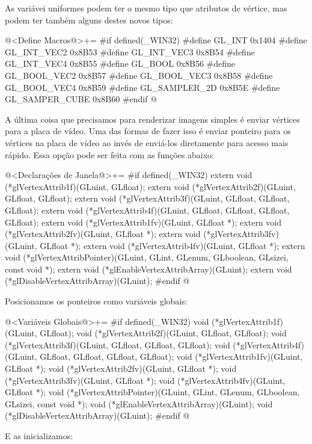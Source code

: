 As variávei uniformes podem ter o mesmo tipo que atributos de vértice,
mas podem ter também alguns destes novos tipos:

\iniciocodigo
@<Define Macros@>+=
#if defined(_WIN32)
#define GL_INT         0x1404
#define GL_INT_VEC2    0x8B53
#define GL_INT_VEC3    0x8B54
#define GL_INT_VEC4    0x8B55
#define GL_BOOL        0x8B56
#define GL_BOOL_VEC2   0x8B57
#define GL_BOOL_VEC3   0x8B58
#define GL_BOOL_VEC4   0x8B59
#define GL_SAMPLER_2D  0x8B5E
#define GL_SAMPER_CUBE 0x8B60
#endif
@
\fimcodigo

A última coisa que precisamos para renderizar imagens simples é enviar
vértices para a placa de vídeo. Uma das formas de fazer isso é enviar
ponteiro para os vértices na placa de vídeo ao invés de enviá-los
diretamente para acesso mais rápido. Essa opção pode ser feita com as
funções abaixo:

\iniciocodigo
@<Declarações de Janela@>+=
#if defined(_WIN32)
extern void (*glVertexAttrib1f)(GLuint, GLfloat);
extern void (*glVertexAttrib2f)(GLuint, GLfloat, GLfloat);
extern void (*glVertexAttrib3f)(GLuint, GLfloat, GLfloat, GLfloat);
extern void (*glVertexAttrib4f)(GLuint, GLfloat, GLfloat, GLfloat, GLfloat);
extern void (*glVertexAttrib1fv)(GLuint, GLfloat *);
extern void (*glVertexAttrib2fv)(GLuint, GLfloat *);
extern void (*glVertexAttrib3fv)(GLuint, GLfloat *);
extern void (*glVertexAttrib4fv)(GLuint, GLfloat *);
extern void (*glVertexAttribPointer)(GLuint, GLint, GLenum, GLboolean,
                                     GLsizei, const void *);
extern void (*glEnableVertexAttribArray)(GLuint);
extern void (*glDisableVertexAttribArray)(GLuint);
#endif
@
\fimcodigo

Posicionamos os ponteiros como variáveis globais:

\iniciocodigo
@<Variáveis Globais@>+=
#if defined(_WIN32)
void (*glVertexAttrib1f)(GLuint, GLfloat);
void (*glVertexAttrib2f)(GLuint, GLfloat, GLfloat);
void (*glVertexAttrib3f)(GLuint, GLfloat, GLfloat, GLfloat);
void (*glVertexAttrib4f)(GLuint, GLfloat, GLfloat, GLfloat, GLfloat);
void (*glVertexAttrib1fv)(GLuint, GLfloat *);
void (*glVertexAttrib2fv)(GLuint, GLfloat *);
void (*glVertexAttrib3fv)(GLuint, GLfloat *);
void (*glVertexAttrib4fv)(GLuint, GLfloat *);
void (*glVertexAttribPointer)(GLuint, GLint, GLenum, GLboolean,
                              GLsizei, const void *);
void (*glEnableVertexAttribArray)(GLuint);
void (*glDisableVertexAttribArray)(GLuint);
#endif
@
\fimcodigo

E as inicializamos:


